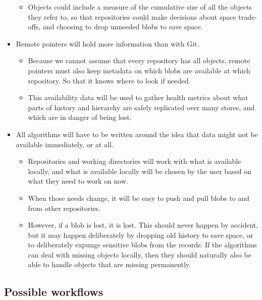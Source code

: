 \documentclass[a4paper]{article}
\begin{document}
\begin{itemize}
  \begin{itemize}
  \item
    Objects could include a measure of the cumulative size of all the objects
    they refer to, so that repositories could make decisions about space
    trade-offs, and choosing to drop unneeded blobs to save space.
  \end{itemize}

\item
  Remote pointers will hold more information than with Git.

  \begin{itemize}
  \item
    Because we cannot assume that every repository has all objects,
    remote pointers must also keep metadata on which blobs are available
    at which repository. So that it knows where to look if needed.
  \item
    This availability data will be used to gather health metrics about
    what parts of history and hierarchy are safely replicated over many
    stores, and which are in danger of being lost.
  \end{itemize}
\item
  All algorithms will have to be written around the idea that data might
  not be available immediately, or at all.

  \begin{itemize}
  \item
    Repositories and working directories will work with what is
    available locally, and what is available locally will be chosen by
    the user based on what they need to work on now.
  \item
    When those needs change, it will be easy to push and pull blobs to
    and from other repositories.
  \item
    However, if a blob is lost, it is lost. This should never happen by
    accident, but it may happen deliberately by dropping old history to
    save space, or to deliberately expunge sensitive blobs from the
    records. If the algorithms can deal with missing objects locally,
    then they should naturally also be able to handle objects that are
    missing permanently.
  \end{itemize}
\end{itemize}


\subsection{Possible workflows}\label{possible-workflows}
\end{document}
